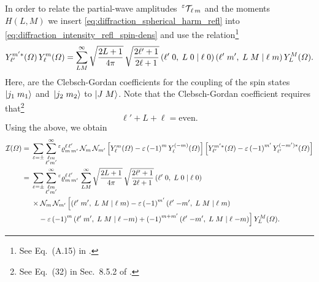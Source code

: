 In order to relate the partial-wave
amplitudes~$\prescript{\ensuremath{\varepsilon}}{}{\mathcal{T\!}}_{\ell\, m}$ and the
moments~$H(L, M)$ we insert \cref{eq:diffraction_spherical_harm_refl}
into \cref{eq:diffraction_intensity_refl_spin-dens} and use the
relation\footnote{See Eq.~(A.15) in .}
\begin{equation}
  \label{eq:spherical_harm_prod}
  Y_{\ell'}^{m' *}(\Omega)\, Y_{\ell}^m(\Omega)
  = \sum_{L M}^\infty \sqrt{\frac{2 L + 1}{4 \pi}}\, \sqrt{\frac{2 \ell' + 1}{2 \ell + 1}}\, ({\ell'}\;{0},\;{L}\;{0}\; |\; {\ell}\;{0})\, ({\ell'}\;{m'},\;{L}\;{M}\; |\; {\ell}\;{m})\, Y_L^M(\Omega).
\end{equation}
Here,  are the Clebsch-Gordan
coefficients for the coupling of the spin states $\ket{j_1\; m_1}$
and~$\ket{j_2\; m_2}$ to $\ket{J\; M}$.  Note that the Clebsch-Gordan
coefficient  requires
that\footnote{See Eq.~(32) in Sec.~8.5.2 of
.}
\begin{equation}
  \label{eq:ang_mom_sum}
  \ell' + L + \ell
  = \text{even}.
\end{equation}
Using the above, we obtain
\begin{align}
  \mathcal{I}(\Omega)
  ={}&
    \sum_{\refl = \pm} \sum_{\substack{\ell m \\ \ell' m'}}^\infty
    \prescript{\refl}{}{\varrho}^{\ell\, \ell'}_{m\, m'}\,
    \mathcal{N}_m\, \mathcal{N}_{m'}
    \sBrk[2]{Y_\ell^m(\Omega) - \refl\, {(-1)}^m\, Y_\ell^{(-m)}(\Omega)}
    \sBrk[2]{Y_{\ell'}^{m' *}(\Omega) - \refl\, {(-1)}^{m'}\, Y_{\ell'}^{(-m') *}(\Omega)}
  \\
  ={}& \begin{multlined}[t][0.85\columnwidth]
    \sum_{\refl = \pm} \sum_{\substack{\ell m \\ \ell' m'}}^\infty
    \prescript{\refl}{}{\varrho}^{\ell\, \ell'}_{m\, m'}\,
    \sum_{L M}^\infty \sqrt{\frac{2 L + 1}{4 \pi}}\, \sqrt{\frac{2 \ell' + 1}{2 \ell + 1}}\, \clebsch{\ell'}{0}{L}{0}{\ell}{0} \\
    \shoveleft{\times \mathcal{N}_m\, \mathcal{N}_{m'}\, \Big[ \clebsch{\ell'}{m'}{L}{M}{\ell}{m}                       - \refl\, {(-1)}^{m'}\, \clebsch{\ell'}{-m'}{L}{M}{\ell}{m}} \\
      - \refl\, {(-1)}^m\, \clebsch{\ell'}{m'}{L}{M}{\ell}{-m} + {(-1)}^{m + m'}\, \clebsch{\ell'}{-m'}{L}{M}{\ell}{-m} \Big]\,
    Y_L^M(\Omega).
  \end{multlined}
\end{align}
